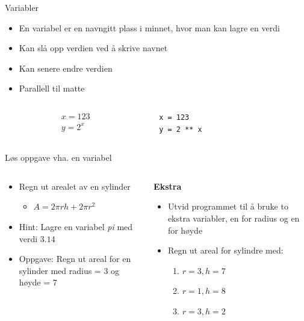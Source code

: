 \documentclass[screen, aspectratio=169]{beamer}
\begin{document}
\begin{frame}[fragile]{Variabler}
	\begin{itemize}
		\item En variabel er en navngitt plass i minnet, hvor man kan lagre en verdi
		\item Kan slå opp verdien ved å skrive navnet
		\item Kan senere endre verdien
		\item Parallell til matte
	\end{itemize}
	
	\begin{columns}
		\begin{column}{.3\textwidth}
			\begin{gather*}
				x = 123\\
				y = 2^x
			\end{gather*}
		\end{column}
		\begin{column}{.7\textwidth}
			\begin{lstlisting}
x = 123
y = 2 ** x
			\end{lstlisting}
		\end{column}
	\end{columns}
	
\end{frame}

\begin{frame}[fragile]{Løs oppgave vha. en variabel}
	\begin{columns}
		\begin{column}{.5\textwidth}
			\begin{itemize}
				\item Regn ut arealet av en sylinder
				\begin{itemize}
					\item $A=2\pi rh + 2\pi r^2$
				\end{itemize}
				\item Hint: Lagre en variabel \emph{pi} med verdi $3.14$
				\item Oppgave: Regn ut areal for en sylinder med radius = 3 og høyde = 7
			\end{itemize}
		\end{column}
	\hspace{-20pt}\vrule\hspace{20pt}
		\begin{column}{.4\textwidth}
			{\large\bfseries Ekstra}
			\begin{itemize}
				\item Utvid programmet til å bruke to ekstra variabler, en for radius og en for høyde
				\item Regn ut areal for sylindre med:
				\begin{enumerate}
					\item $r=3, h=7$
					\item $r=1, h=8$
					\item $r=3, h=2$
				\end{enumerate}
			\end{itemize}
		\end{column}
	\end{columns}
\end{frame}
\end{document}
